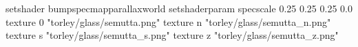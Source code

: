 setshader bumpspecmapparallaxworld
setshaderparam specscale 0.25 0.25 0.25 0.0
texture 0 "torley/glass/semutta.png"
texture n "torley/glass/semutta_n.png"
texture s "torley/glass/semutta_s.png"
texture z "torley/glass/semutta_z.png"

